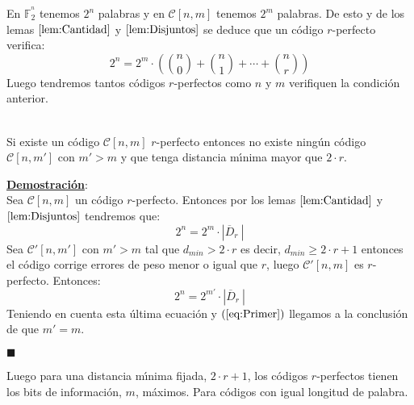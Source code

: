 En $\mathbb{F}^{^n}_2$ tenemos $2^n$ palabras y en $\mathcal{C}[n,m]$ tenemos
$2^m$ palabras. De esto y de los lemas $\ref{lem:Cantidad}$ y
$\ref{lem:Disjuntos}$ se deduce que un c\'odigo $r$-perfecto verifica:
\begin{displaymath}
2^n=2^m\cdot\left({n\choose 0}+{n\choose 1}+\cdots+{n\choose r} \right)
\end{displaymath}
Luego tendremos tantos c\'odigos $r$-perfectos como $n$ y $m$ verifiquen la
condici\'on anterior.
%
\newpage
%
\begin{proposicion}
\ \\
Si existe un c\'odigo $\mathcal{C}[n,m]$ $r$-perfecto entonces no existe
ning\'un c\'odigo $\mathcal{C}[n,m']$ con $m'>m$ y que tenga distancia 
m\'{\i}nima mayor que $2\cdot r$.
\end{proposicion}
\underline{\textbf{Demostraci\'on}}:\\
Sea $\mathcal{C}[n,m]$ un c\'odigo $r$-perfecto. Entonces por los lemas
$\ref{lem:Cantidad}$ y $\ref{lem:Disjuntos}$ tendremos que:
\begin{equation}\label{eq:Primer}
2^n=2^m\cdot |\overline{D}_r\ |
\end{equation}
Sea $\mathcal{C}'[n,m']$ con $m'>m$ tal que $d_{min}>2\cdot r$ es decir,
$d_{min}\geq2\cdot r+1$ entonces el c\'odigo corrige errores de peso menor o
igual que $r$, luego $\mathcal{C}'[n,m]$ es $r$-perfecto. Entonces:
\begin{displaymath}
2^n=2^{m'}\cdot |\overline{D}_r\ |
\end{displaymath}
Teniendo en cuenta esta \'ultima ecuaci\'on y $(\ref{eq:Primer})$ llegamos a
la conclusi\'on de que $m'=m$.
\begin{flushright}
$\blacksquare$
\end{flushright}
Luego para una distancia m\'{\i}nima fijada, $2\cdot r+1$, los c\'odigos
$r$-perfectos tienen los bits de informaci\'on, $m$, m\'aximos. Para c\'odigos
con igual longitud de palabra.

